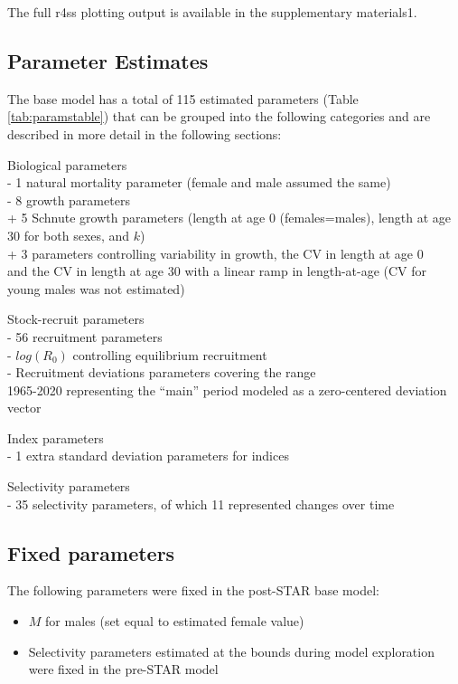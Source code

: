 \documentclass[
  english,
  a4paper,
]{article}
\providecommand{\tightlist}{%
  \setlength{\itemsep}{0pt}\setlength{\parskip}{0pt}}
\begin{document}
The full r4ss plotting output is available in the supplementary materials1.

\hypertarget{parameter-estimates}{%
\subsection{Parameter Estimates}\label{parameter-estimates}}

The base model has a total of 115 estimated parameters
(Table \ref{tab:paramstable}) that can be grouped into the following
categories and are described in more detail in the following sections:

Biological parameters\\
- 1 natural mortality parameter (female and male assumed the same)\\
- 8 growth parameters\\
+ 5 Schnute growth parameters (length at age 0 (females=males), length at age 30 for both sexes, and \(k\))\\
+ 3 parameters controlling variability in growth, the CV in length at age 0\\
and the CV in length at age 30 with a linear ramp in length-at-age (CV for young males was not estimated)

Stock-recruit parameters\\
- 56 recruitment parameters\\
- \(log(R_0)\) controlling equilibrium recruitment\\
- Recruitment deviations parameters covering the range\\
1965-2020
representing the ``main'' period modeled as a zero-centered deviation vector

Index parameters\\
- 1 extra standard deviation parameters
for indices

Selectivity parameters\\
- 35 selectivity parameters, of which
11 represented changes over time

\hypertarget{fixed-parameters}{%
\subsection{Fixed parameters}\label{fixed-parameters}}

The following parameters were fixed in the post-STAR base model:

\begin{itemize}
\tightlist
\item
  \(M\) for males (set equal to estimated female value)
\item
  Selectivity parameters estimated at the bounds during model exploration were fixed in the pre-STAR model
\end{itemize}
\end{document}
